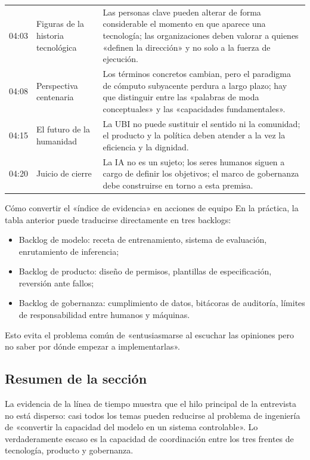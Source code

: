 \begin{longtable}{p{}p{}p{}}
04:03 & Figuras de la historia tecnológica & Las personas clave pueden alterar de forma considerable el momento en que aparece una tecnología; las organizaciones deben valorar a quienes «definen la dirección» y no solo a la fuerza de ejecución. \\
04:08 & Perspectiva centenaria & Los términos concretos cambian, pero el paradigma de cómputo subyacente perdura a largo plazo; hay que distinguir entre las «palabras de moda conceptuales» y las «capacidades fundamentales». \\
04:15 & El futuro de la humanidad & La UBI no puede sustituir el sentido ni la comunidad; el producto y la política deben atender a la vez la eficiencia y la dignidad. \\
04:20 & Juicio de cierre & La IA no es un sujeto; los seres humanos siguen a cargo de definir los objetivos; el marco de gobernanza debe construirse en torno a esta premisa. \\
\bottomrule
\end{longtable}

\begin{knowledgebox}{Cómo convertir el «índice de evidencia» en acciones de equipo}
En la práctica, la tabla anterior puede traducirse directamente en tres backlogs:
\begin{itemize}[leftmargin=1.5em]
    \item Backlog de modelo: receta de entrenamiento, sistema de evaluación, enrutamiento de inferencia;
    \item Backlog de producto: diseño de permisos, plantillas de especificación, reversión ante fallos;
    \item Backlog de gobernanza: cumplimiento de datos, bitácoras de auditoría, límites de responsabilidad entre humanos y máquinas.
\end{itemize}
Esto evita el problema común de «entusiasmarse al escuchar las opiniones pero no saber por dónde empezar a implementarlas».
\end{knowledgebox}

\subsection{Resumen de la sección}

La evidencia de la línea de tiempo muestra que el hilo principal de la entrevista no está disperso: casi todos los temas pueden reducirse al problema de ingeniería de «convertir la capacidad del modelo en un sistema controlable». Lo verdaderamente escaso es la capacidad de coordinación entre los tres frentes de tecnología, producto y gobernanza.
